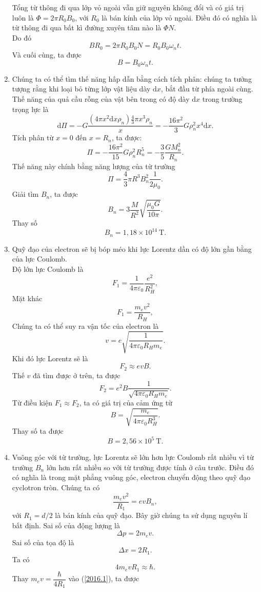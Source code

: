 \begin{loigiai}
\begin{enumerate}[1) ]
    Tổng từ thông đi qua lớp vỏ ngoài vẫn giữ nguyên không đổi  và có giá trị luôn là $\Phi=2\pi R_0B_0$, với $R_0$ là bán kính của lớp vỏ ngoài. Điều đó có nghĩa là từ thông đi qua bất kì đường xuyên tâm nào là $\Phi N$.\\
    Do đó
    \[BR_0=2\pi R_0 B_0N=R_0B_0\omega_{n}t.\]
    Và cuối cùng, ta được
    \[B=B_0\omega_{n}t.\]
    \item Chúng ta có thể tìm thế năng hấp dẫn bằng cách tích phân: chúng ta tưởng tượng rằng khi loại bỏ từng lớp vật liệu dày $\mathrm{d}x$, bắt đầu từ phía ngoài cùng. Thế năng của quả cầu rỗng của vật bên trong có độ dày $\mathrm{d}x$ trong trường trọng lực là
    \[\mathrm{d}\Pi=-G\dfrac{(4\pi x^2\mathrm{d}x\rho_{n})\frac{4}{3}\pi x^3\rho_{n}}{x}=-\dfrac{16\pi^2}{3}G\rho_{n}^2x^4\mathrm{d}x.\]
    Tích phân từ $x=0$ đến $x=R_{n}$, ta được:
    \[\Pi=-\dfrac{16\pi^2}{15}G\rho_n^2 R_{n}^5=-\dfrac{3}{5}\dfrac{GM_{n}^2}{R_{n}}.\]
    Thế năng này chính bằng năng lượng của từ trường
    \[\Pi=\dfrac{4}{3}\pi R^3B_{n}^2\dfrac{1}{2\mu_0}.\]
    Giải tìm $B_{n}$, ta được
    \[B_{n}=3\dfrac{M}{R^2}\sqrt{\dfrac{\mu_0G}{10\pi}}.\]
    Thay số
    \[B_{n}=1,18\times 10^{14}~\mathrm{T}.\]
    \item Quỹ đạo của electron sẽ bị bóp méo khi lực Lorentz dần có độ lớn gần bằng của lực Coulomb.\\
    Độ lớn lực Coulomb là
    \[F_1=\dfrac{1}{4\pi \varepsilon_0}\dfrac{e^2}{R_{H}^2},\]
    Mặt khác
    \[F_1=\dfrac{m_{e}v^2}{R_{H}},\]
    Chúng ta có thể suy ra vận tốc của electron là
    \[v=e\sqrt{\dfrac{1}{4\pi \varepsilon_0 R_{H}m_{e}}}.\]
    Khi đó lực Lorentz sẽ là
    \[F_2\approx evB.\]
    Thế $v$ đã tìm được ở trên, ta được
    \[F_2=e^2B\dfrac{1}{\sqrt{4\pi \varepsilon_0 R_{H}m_{e}}}.\]
    Từ điều kiện $F_1\approx F_2$, ta có giá trị của cảm ứng từ
    \[B=\sqrt{\dfrac{m_{e}}{4\pi \varepsilon_0 R_{H}^3}}.\]
    Thay số ta được
    \[B=2,56\times 10^5~\mathrm{T}.\]
    \item Vuông góc với từ trường, lực Lorentz sẽ lớn hơn lực Coulomb rất nhiều vì từ trường $B_{n}$ lớn hơn rất nhiều so với từ trường được tính ở câu trước. Điều đó có nghĩa là trong mặt phẳng vuông góc, electron chuyển động theo quỹ đạo cyclotron tròn.
    Chúng ta có
    \[\dfrac{m_{e}v^2}{R_1}=evB_{n}, \tag{1} \label{2016.1}\]
    với $R_1 = d/2$ là bán kính của quỹ đạo. Bây giờ chúng ta sử dụng nguyên lí bất định. Sai số của động lượng là
    \[\Delta p=2m_{e}v.\]
    Sai số của tọa độ là
    \[\Delta x=2R_1.\]
    Ta có
    \[4m_{e}vR_1\approx \hbar.\]
    Thay $m_{e}v=\dfrac{\hbar}{4R_1}$ vào (\ref{2016.1}), ta được

\end{enumerate}
\end{loigiai}
